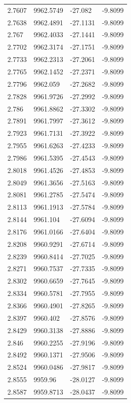 \begin{table}[H]
\begin{tabular}{llll}
2.7607 & 9962.5749 & -27.082 & -9.8099 \\
2.7638 & 9962.4891 & -27.1131 & -9.8099 \\
2.767 & 9962.4033 & -27.1441 & -9.8099 \\
2.7702 & 9962.3174 & -27.1751 & -9.8099 \\
2.7733 & 9962.2313 & -27.2061 & -9.8099 \\
2.7765 & 9962.1452 & -27.2371 & -9.8099 \\
2.7796 & 9962.059 & -27.2682 & -9.8099 \\
2.7828 & 9961.9726 & -27.2992 & -9.8099 \\
2.786 & 9961.8862 & -27.3302 & -9.8099 \\
2.7891 & 9961.7997 & -27.3612 & -9.8099 \\
2.7923 & 9961.7131 & -27.3922 & -9.8099 \\
2.7955 & 9961.6263 & -27.4233 & -9.8099 \\
2.7986 & 9961.5395 & -27.4543 & -9.8099 \\
2.8018 & 9961.4526 & -27.4853 & -9.8099 \\
2.8049 & 9961.3656 & -27.5163 & -9.8099 \\
2.8081 & 9961.2785 & -27.5474 & -9.8099 \\
2.8113 & 9961.1913 & -27.5784 & -9.8099 \\
2.8144 & 9961.104 & -27.6094 & -9.8099 \\
2.8176 & 9961.0166 & -27.6404 & -9.8099 \\
2.8208 & 9960.9291 & -27.6714 & -9.8099 \\
2.8239 & 9960.8414 & -27.7025 & -9.8099 \\
2.8271 & 9960.7537 & -27.7335 & -9.8099 \\
2.8302 & 9960.6659 & -27.7645 & -9.8099 \\
2.8334 & 9960.5781 & -27.7955 & -9.8099 \\
2.8366 & 9960.4901 & -27.8265 & -9.8099 \\
2.8397 & 9960.402 & -27.8576 & -9.8099 \\
2.8429 & 9960.3138 & -27.8886 & -9.8099 \\
2.846 & 9960.2255 & -27.9196 & -9.8099 \\
2.8492 & 9960.1371 & -27.9506 & -9.8099 \\
2.8524 & 9960.0486 & -27.9817 & -9.8099 \\
2.8555 & 9959.96 & -28.0127 & -9.8099 \\
2.8587 & 9959.8713 & -28.0437 & -9.8099 \\

\end{tabular}
\end{table}
